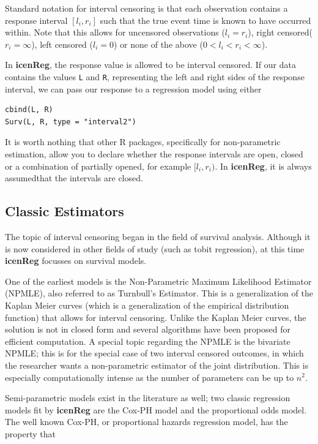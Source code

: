 \documentclass[a4paper]{article}
\begin{document}
Standard notation for interval censoring is that each observation contains a response interval $[l_i,r_i]$ such that the true event time is known to have occurred within. Note that this allows for uncensored observations ($l_i = r_i$), right censored($r_i = \infty$), left censored ($l_i = 0$) or none of the above ($0 < l_i < r_i < \infty$). 
  
In {\bf icenReg}, the response value is allowed to be interval censored. If our data contains the values \texttt{L} and \texttt{R}, representing the left and right sides of the response interval, we can pass our response to a regression model using either
  
\begin{verbatim}
cbind(L, R)
Surv(L, R, type = "interval2")
\end{verbatim}
  
It is worth nothing that other R packages, specifically for non-parametric estimation, allow you to declare whether the response intervals are open, closed or a combination of partially opened, for example $[l_i, r_i)$. In {\bf icenReg}, it is always assumedthat the intervals are closed. 
  
\subsection{Classic Estimators}
  
The topic of interval censoring began in the field of survival analysis. Although it is now considered in other fields of study (such as tobit regression), at this time {\bf{icenReg}} focusses on survival models. 

One of the earliest models is the Non-Parametric Maximum Likelihood Estimator (NPMLE), also referred to as Turnbull's Estimator. This is a generalization of the Kaplan Meier curves (which is a generalization of the empirical distribution function) that allows for interval censoring. Unlike the Kaplan Meier curves, the solution is not in closed form and several algorithms have been proposed for efficient computation. A special topic regarding the NPMLE is the bivariate NPMLE; this is for the special case of two interval censored outcomes, in which the researcher wants a non-parametric estimator of the joint distribution. This is especially computationally intense as the number of parameters can be up to $n^2$. 
  
Semi-parametric models exist in the literature as well; two classic regression models fit by {\bf icenReg} are the Cox-PH model and the proportional odds model. The well known Cox-PH, or proportional hazards regression model, has the property that
  
\end{document}
